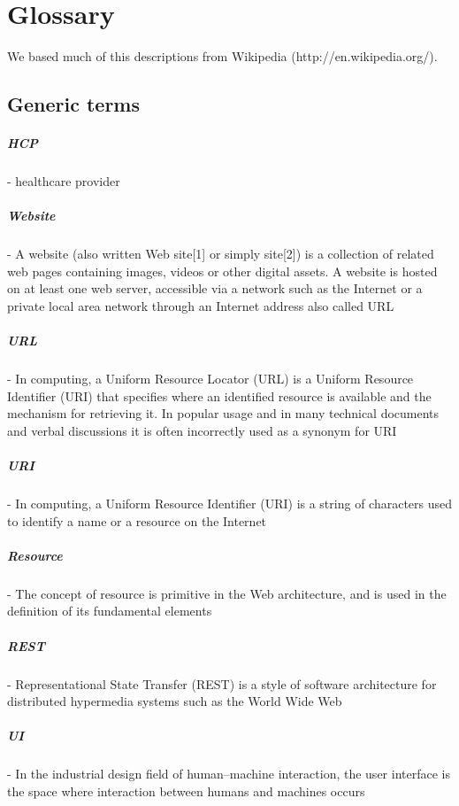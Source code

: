 \chapter{Glossary}
We based much of this descriptions from Wikipedia (http://en.wikipedia.org/).

\section{Generic terms}
\paragraph{HCP}- healthcare provider
\paragraph{Website} - A website (also written Web site[1] or simply site[2]) is a collection of related web pages containing images, videos or other digital assets. A website is hosted on at least one web server, accessible via a network such as the Internet or a private local area network through an Internet address also called URL
\paragraph{URL} - In computing, a Uniform Resource Locator (URL) is a Uniform Resource Identifier (URI) that specifies where an identified resource is available and the mechanism for retrieving it. In popular usage and in many technical documents and verbal discussions it is often incorrectly used as a synonym for URI
\paragraph{URI} - In computing, a Uniform Resource Identifier (URI) is a string of characters used to identify a name or a resource on the Internet
\paragraph{Resource} - The concept of resource is primitive in the Web architecture, and is used in the definition of its fundamental elements
\paragraph{REST} - Representational State Transfer (REST) is a style of software architecture for distributed hypermedia systems such as the World Wide Web
\paragraph{UI} - In the industrial design field of human–machine interaction, the user interface is the space where interaction between humans and machines occurs

